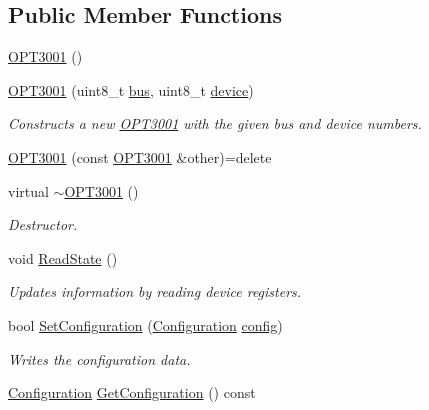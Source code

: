 \subsection*{Public Member Functions}
\begin{DoxyCompactItemize}
\item 
\hyperlink{classcubesat_1_1OPT3001_af8e948ecc4d4979484f226c48dcf4285}{O\+P\+T3001} ()
\item 
\hyperlink{classcubesat_1_1OPT3001_a0c985e7f3634b077e4b3955cb3c41b95}{O\+P\+T3001} (uint8\+\_\+t \hyperlink{classcubesat_1_1I2CDevice_acc13c6328bb7f29ddc5b9436d6b40816}{bus}, uint8\+\_\+t \hyperlink{classcubesat_1_1I2CDevice_a59cdefbd8b9720d194254c617f5c9b07}{device})
\begin{DoxyCompactList}\small\item\em Constructs a new \hyperlink{classcubesat_1_1OPT3001}{O\+P\+T3001} with the given bus and device numbers. \end{DoxyCompactList}\item 
\hyperlink{classcubesat_1_1OPT3001_ad2a4f35373ae73e42635ec261dc86e56}{O\+P\+T3001} (const \hyperlink{classcubesat_1_1OPT3001}{O\+P\+T3001} \&other)=delete
\item 
virtual \hyperlink{classcubesat_1_1OPT3001_af852a60be53aa8585ff8d1346ec5fa76}{$\sim$\+O\+P\+T3001} ()
\begin{DoxyCompactList}\small\item\em Destructor. \end{DoxyCompactList}\item 
void \hyperlink{classcubesat_1_1OPT3001_afb44b36406326e3af20a4cf63602baa7}{Read\+State} ()
\begin{DoxyCompactList}\small\item\em Updates information by reading device registers. \end{DoxyCompactList}\item 
bool \hyperlink{classcubesat_1_1OPT3001_a6df0cf4e46e38bbe9909f8e905b7540e}{Set\+Configuration} (\hyperlink{unioncubesat_1_1OPT3001_1_1Configuration}{Configuration} \hyperlink{classcubesat_1_1OPT3001_acf76526638ac9210adb947fa6b4b155f}{config})
\begin{DoxyCompactList}\small\item\em Writes the configuration data. \end{DoxyCompactList}\item 
\hyperlink{unioncubesat_1_1OPT3001_1_1Configuration}{Configuration} \hyperlink{classcubesat_1_1OPT3001_a19a22f506667bae934b78e588db9db70}{Get\+Configuration} () const

\end{DoxyCompactItemize}
